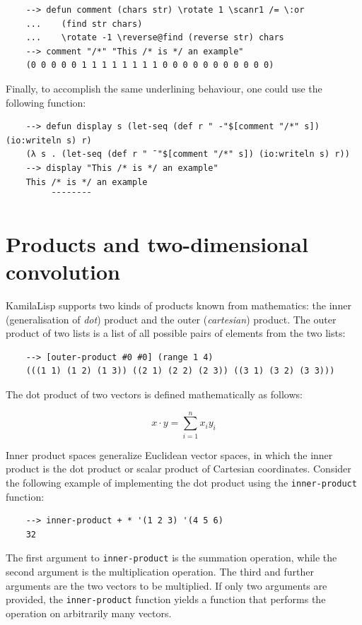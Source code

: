 \begin{Verbatim}
    --> defun comment (chars str) \rotate 1 \scanr1 /= \:or
    ...    (find str chars)
    ...    \rotate -1 \reverse@find (reverse str) chars
    --> comment "/*" "This /* is */ an example"
    (0 0 0 0 0 1 1 1 1 1 1 1 1 0 0 0 0 0 0 0 0 0 0 0)
\end{Verbatim}

Finally, to accomplish the same underlining behaviour, one could use the following function:

\begin{Verbatim}
    --> defun display s (let-seq (def r " -"$[comment "/*" s]) (io:writeln s) r)
    (λ s . (let-seq (def r " ¯"$[comment "/*" s]) (io:writeln s) r))
    --> display "This /* is */ an example"
    This /* is */ an example
         ¯¯¯¯¯¯¯¯
\end{Verbatim}

\section{Products and two-dimensional convolution}

KamilaLisp supports two kinds of products known from mathematics: the inner (generalisation of \textit{dot}) product and the outer (\textit{cartesian}) product. The outer product of two lists is a list of all possible pairs of elements from the two lists:

\begin{Verbatim}
    --> [outer-product #0 #0] (range 1 4)
    (((1 1) (1 2) (1 3)) ((2 1) (2 2) (2 3)) ((3 1) (3 2) (3 3)))
\end{Verbatim}

The dot product of two vectors is defined mathematically as follows:

$$
{\displaystyle x \cdot y = \sum_{i=1}^{n}x_{i}y_{i}}
$$

Inner product spaces generalize Euclidean vector spaces, in which the inner product is the dot product or scalar product of Cartesian coordinates. Consider the following example of implementing the dot product using the \verb|inner-product| function:

\begin{Verbatim}
    --> inner-product + * '(1 2 3) '(4 5 6)
    32
\end{Verbatim}

The first argument to \verb|inner-product| is the summation operation, while the second argument is the multiplication operation. The third and further arguments are the two vectors to be multiplied. If only two arguments are provided, the \verb|inner-product| function yields a function that performs the operation on arbitrarily many vectors.

